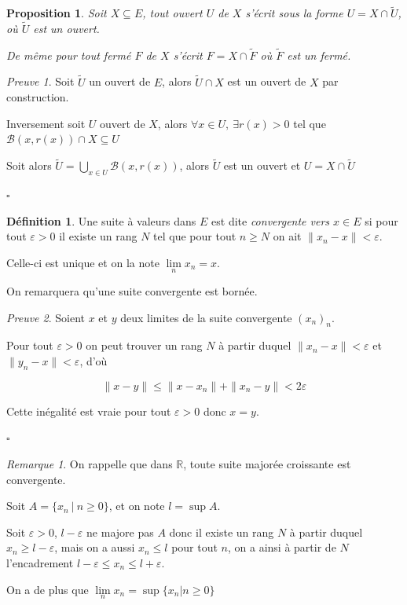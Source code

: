 \documentclass[]{article}
\newtheorem{myproposition}{Proposition}
\theoremstyle{remark}
\newtheorem{myrem}{Remarque}
\newtheorem{myproof}{Preuve}
\theoremstyle{definition}
\newtheorem{mydef}{Définition}
\newcommand{\cqfd}{
	\hfill$\square$
}
\begin{document}
\begin{myproposition}
	Soit $X \subseteq E$, tout ouvert $U$ de $X$ s'écrit sous la forme $U=X \cap \widetilde{U}$, où $\widetilde{U}$ est un ouvert.
	
	De même pour tout fermé $F$ de $X$ s'écrit $F=X \cap \widetilde{F}$ où $\widetilde{F}$ est un fermé.
\end{myproposition}

\begin{myproof}
	Soit $\widetilde{U}$ un ouvert de $E$, alors $\widetilde{U} \cap X$ est un ouvert de $X$ par construction.
	
	Inversement soit $U$ ouvert de $X$, alors $\forall x \in U, ~ \exists r(x) > 0$ tel que $\mathcal{B}(x, r(x)) \cap X \subseteq U$
	
	Soit alors $\displaystyle \widetilde{U} = \bigcup_{x \in U} \mathcal{B}(x, r(x))$, alors $\widetilde{U}$ est un ouvert et $U = X \cap \widetilde{U}$
	\cqfd
\end{myproof}

\begin{mydef}
	Une suite à valeurs dans $E$ est dite \textit{convergente vers $x \in E$} si pour tout $\varepsilon > 0$ il existe un rang $N$ tel que pour tout $n \geqslant N$ on ait $\|x_n-x\| < \varepsilon$.
	
	Celle-ci est unique et on la note $\lim\limits_{n} x_n = x$.
\end{mydef}

On remarquera qu'une suite convergente est bornée.

\begin{myproof}
	Soient $x$ et $y$ deux limites de la suite convergente $(x_n)_n$.
	
	Pour tout $\varepsilon > 0$ on peut trouver un rang $N$ à partir duquel $\|x_n-x\|<\varepsilon$ et $\|y_n-x\|<\varepsilon$, d'où
	
	$$\|x-y\| \leqslant \|x-x_n\| + \|x_n-y\| < 2\varepsilon$$
	
	Cette inégalité est vraie pour tout $\varepsilon>0$ donc $x=y$.
	
	\cqfd
\end{myproof}

\begin{myrem}
	On rappelle que dans $\mathbb{R}$, toute suite majorée croissante est convergente.
	
	Soit $A=\{x_n ~ | ~ n \geqslant 0\}$, et on note $l = \sup A$.
	
	Soit $\varepsilon > 0$, $l - \varepsilon$ ne majore pas $A$ donc il existe un rang $N$ à partir duquel $x_n \geqslant l-\varepsilon$, mais on a aussi $x_n \leqslant l$ pour tout $n$, on a ainsi à partir de $N$ l'encadrement $l - \varepsilon \leqslant x_n \leqslant l + \varepsilon$.
	
	On a de plus que $\lim\limits_{n} x_n = \sup \{x_n | n \geqslant 0\}$
\end{myrem}
\end{document}
